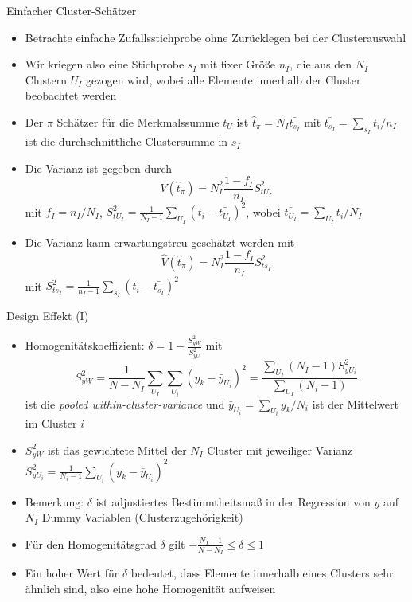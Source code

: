 \documentclass[9pt]{beamer}
\begin{document}
\begin{frame}{Einfacher Cluster-Schätzer}
\begin{itemize}
	\item Betrachte einfache Zufallsstichprobe ohne Zurücklegen bei der Clusterauswahl
	\item Wir kriegen also eine Stichprobe $s_I$ mit fixer Größe $n_I$, die aus den $N_I$ Clustern $U_I$ gezogen wird, wobei alle Elemente innerhalb der Cluster beobachtet werden
	\item Der $\pi$ Schätzer für die Merkmalssumme $t_U$ ist $\hat{t}_\pi = N_I \bar{t_{s_{I}}}$ mit $\bar{t_{s_{I}}} = \sum_{s_I} t_i/n_I$ ist die durchschnittliche Clustersumme in $s_I$
	\item Die Varianz ist gegeben durch $$V(\hat{t}_\pi) = N_I^2\frac{1-f_I}{n_I}S_{tU_I}^2$$ mit $f_I = n_I/N_I$,  $S_{tU_I}^2 = \frac{1}{N_I - 1}\sum_{U_I} (t_i - \bar{t_{U_{I}}})^2 $, wobei $\bar{t_{U_{I}}} = \sum_{U_I} t_i/N_I$
	\item Die Varianz kann erwartungstreu geschätzt werden mit $$\hat{V}(\hat{t}_\pi) = N_I^2 \frac{1-f_I}{n_I} S_{ts_I}^2$$ mit $S_{ts_I}^2 = \frac{1}{n_I - 1}\sum_{s_I} (t_i - \bar{t_{s_{I}}})^2 $
\end{itemize}
\end{frame}


\begin{frame}{Design Effekt (I)}
\begin{itemize}
	\item Homogenitätskoeffizient: $\delta = 1-\frac{S_{yW}^2}{S_{yU}^2}$ mit $$S_{yW}^2 = \frac{1}{N- N_I}\sum_{U_I}\sum_{U_i} (y_k - \bar{y}_{U_i})^2 = \frac{\sum_{U_I}(N_I-1)S_{yU_i}^2}{\sum_{U_I}(N_i-1)}$$ ist die \textit{pooled within-cluster-variance} und $\bar{y}_{U_i}= \sum_{U_i}y_k/N_i$ ist der Mittelwert im Cluster $i$
	\item $S_{yW}^2$ ist das gewichtete Mittel der $N_I$ Cluster mit jeweiliger Varianz $S_{y U_i}^2 = \frac{1}{N_i-1}\sum_{U_i}(y_k - \bar{y}_{U_i})^2$
	\item Bemerkung: $\delta$ ist adjustiertes Bestimmtheitsmaß in der Regression von $y$ auf $N_I$ Dummy Variablen (Clusterzugehörigkeit)
	\item Für den Homogenitätsgrad $\delta$ gilt $-\frac{N_I -1}{N-N_I} \leq \delta \leq 1$
	\item Ein hoher Wert für $\delta$ bedeutet, dass Elemente innerhalb eines Clusters sehr ähnlich sind, also eine hohe Homogenität aufweisen
\end{itemize}
\end{frame}
\end{document}
